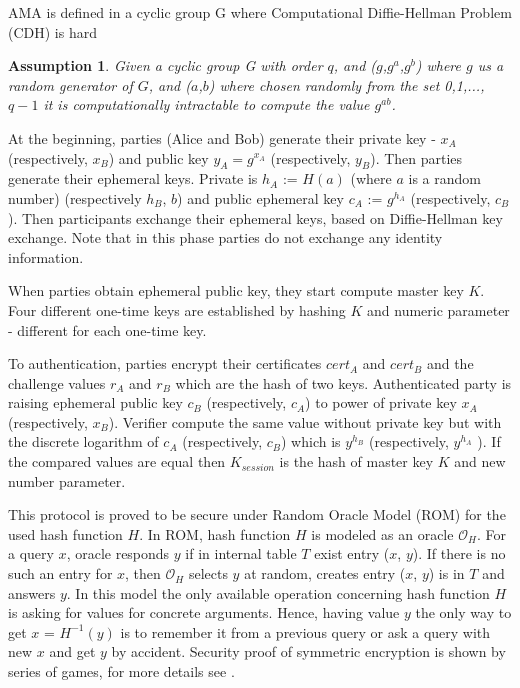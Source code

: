 \documentclass[11pt,titlepage]{article}
\theoremstyle{plain}
\newtheorem{assumption}{Assumption}
\begin{document}
AMA is defined in a cyclic group G where Computational Diffie-Hellman Problem (CDH) is hard

\begin{assumption}
Given a cyclic group G with order $q$, and ($g$,$g^a$,$g^b$) where $g$ us a random generator of $G$, and ($a$,$b$) where chosen randomly from the set {0,1,...,$q-1$} it is computationally intractable to compute the value $g^{ab}$.
\end{assumption}

At the beginning, parties (Alice and Bob) generate their private key - $x_A$ (respectively, $x_B$) and public key $y_A = g^{x_A}$ (respectively, $y_B$). Then parties generate their ephemeral keys. Private is $h_A$ := $H(a)$ (where $a$ is a random number) (respectively $h_B$, $b$) and public ephemeral key $c_A$ := $g^{h_A}$ (respectively, $c_B$). Then participants exchange their ephemeral keys, based on Diffie-Hellman key exchange. Note that in this phase parties do not exchange any identity information.

\vspace{5mm}

When parties obtain ephemeral public key, they start compute master
key $K$. Four different one-time keys are established by hashing $K$ and numeric parameter - different for each one-time key.

\vspace{5mm}

To authentication, parties encrypt their certificates $cert_A$ and $cert_B$ and the challenge values $r_A$ and $r_B$ which are the hash of two keys. Authenticated party is raising ephemeral public key $c_B$ (respectively, $c_A$) to power of private key $x_A$ (respectively, $x_B$). Verifier compute the same value without private key but with the discrete logarithm of $c_A$ (respectively, $c_B$) which is $y^{h_B}$ (respectively, $y^{h_A}$ ). If the compared values are equal then $K_{session}$ is the hash of master key $K$ and new number parameter.

\vspace{5mm}

This protocol is proved to be secure under Random Oracle Model (ROM) for the used
hash function $H$. In ROM, hash function $H$ is modeled as an oracle $\mathcal{O}_H$. For a query $x$, oracle responds $y$ if in internal table $T$ exist entry ($x$, $y$). If there is no such an entry for $x$, then $\mathcal{O}_H$ selects $y$ at random, creates entry ($x$, $y$) is in $T$ and answers $y$. In this model the only available operation concerning hash function $H$ is asking for values for concrete arguments. Hence, having value $y$ the only way to get $x$ = $H^{-1}(y)$ is to remember it from a previous query or ask a query with new $x$ and get $y$ by accident. Security proof of symmetric encryption is shown by series of games, for more details see \cite{AMA}. 
\end{document}
